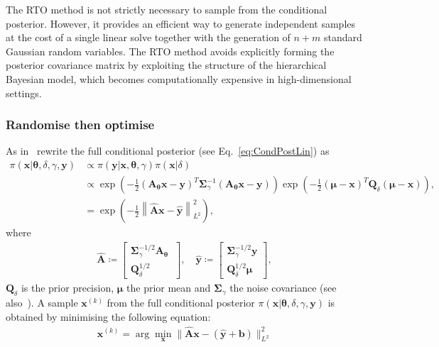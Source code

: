\begin{mccorrection} 
The RTO method is not strictly necessary to sample from the conditional posterior. However, it provides an efficient way to generate independent samples at the cost of a single linear solve together with the generation of $n+m$ standard Gaussian random variables. The RTO method avoids explicitly forming the posterior covariance matrix by exploiting the structure of the hierarchical Bayesian model, which becomes computationally expensive in high-dimensional settings.
\end{mccorrection} 

\subsubsection{Randomise then optimise}
\label{subsec:RTO} 
As in~\cite{bardsley2012mcmc} rewrite the full conditional posterior (see Eq.~\ref{eq:CondPostLin}) as
\begin{align}
	\pi(\bm{x} | \bm{\theta},  \delta, \gamma, \bm{y}) & \propto \pi(\bm{y}|\bm{x},  \bm{\theta}, \gamma) \pi(\bm{x}| \delta)\\
	&\propto \exp \left(-\frac{1}{2} (\bm{A}_{\bm{\theta}}  \bm{x} - \bm{y})^T \bm{\Sigma}^{-1}_{\gamma} (\bm{A}_{\bm{\theta}}   \bm{x} - \bm{y})\right) \exp \left(-\frac{1}{2} (\bm{\mu} - \bm{x} )^T \bm{Q}_{\delta}(\bm{\mu} - \bm{x} ) \right),\\
	& = \exp \left( - \frac{1}{2}\left\lVert \hat{\bm{A}} \bm{x} - \hat{\bm{y}} \right\rVert_{L^2}^2 \right),
\end{align}
where
\begin{align}
	\hat{\bm{A}} \coloneqq 
	\begin{bmatrix}
		\bm{\Sigma}_{\gamma}^{-1/2} \bm{A}_{\bm{\theta}} \ \\
		\bm{Q}_{\delta}^{1/2}
	\end{bmatrix}, \quad 
	\hat{\bm{y}} \coloneqq 
	\begin{bmatrix}
		\bm{\Sigma}_{\gamma}^{-1/2} \bm{y} \\
		\bm{Q}_{\delta}^{1/2} \bm{\mu}
	\end{bmatrix} , 
\end{align}
$\bm{Q}_{\delta}$ is the prior precision, $\bm{\mu}$ the prior mean and $\bm{\Sigma}_{\gamma}$ the noise covariance (see also~\cite{bardsley2014randomize,BardsleyTC2019RTO}).
A sample $\bm{x}^{(k)}$ from the full conditional posterior $ \pi(\bm{x}|   \bm{\theta},  \delta, \gamma,  \bm{y})$ is obtained by minimising the following equation:
\begin{align}
	\bm{x}^{(k)} = \arg \min_{\bm{x}} \lVert \hat{\bm{A}} \bm{x} - ( \hat{\bm{y}} + \bm{b} ) \rVert_{L^2}^2 	\label{eq:minimizer}
\end{align}
